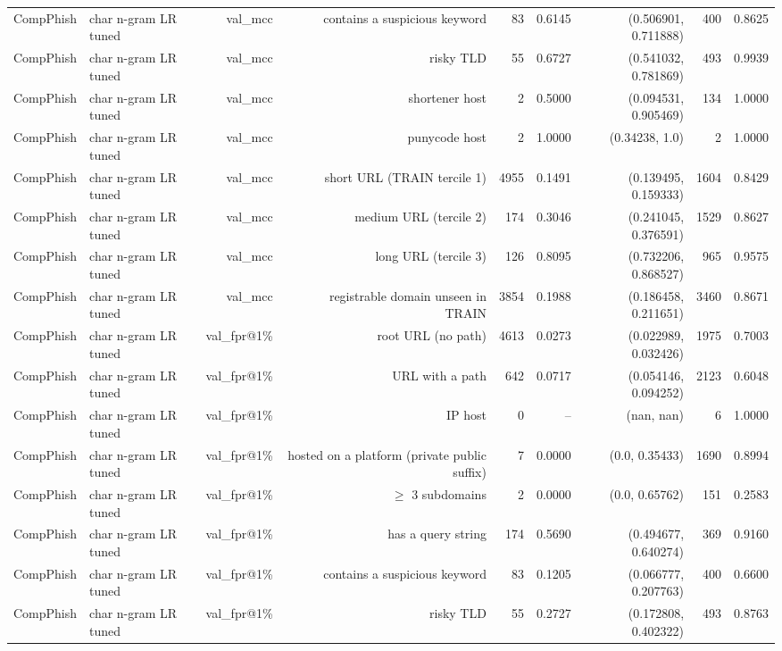 \begin{table}[t]
\begin{tabular}{llrrrrrrr}
CompPhish & char n-gram LR tuned & val\_mcc & contains a suspicious keyword & 83 & 0.6145 & (0.506901, 0.711888) & 400 & 0.8625 \\
CompPhish & char n-gram LR tuned & val\_mcc & risky TLD & 55 & 0.6727 & (0.541032, 0.781869) & 493 & 0.9939 \\
CompPhish & char n-gram LR tuned & val\_mcc & shortener host & 2 & 0.5000 & (0.094531, 0.905469) & 134 & 1.0000 \\
CompPhish & char n-gram LR tuned & val\_mcc & punycode host & 2 & 1.0000 & (0.34238, 1.0) & 2 & 1.0000 \\
CompPhish & char n-gram LR tuned & val\_mcc & short URL (TRAIN tercile 1) & 4955 & 0.1491 & (0.139495, 0.159333) & 1604 & 0.8429 \\
CompPhish & char n-gram LR tuned & val\_mcc & medium URL (tercile 2) & 174 & 0.3046 & (0.241045, 0.376591) & 1529 & 0.8627 \\
CompPhish & char n-gram LR tuned & val\_mcc & long URL (tercile 3) & 126 & 0.8095 & (0.732206, 0.868527) & 965 & 0.9575 \\
CompPhish & char n-gram LR tuned & val\_mcc & registrable domain unseen in TRAIN & 3854 & 0.1988 & (0.186458, 0.211651) & 3460 & 0.8671 \\
CompPhish & char n-gram LR tuned & val\_fpr@1\% & root URL (no path) & 4613 & 0.0273 & (0.022989, 0.032426) & 1975 & 0.7003 \\
CompPhish & char n-gram LR tuned & val\_fpr@1\% & URL with a path & 642 & 0.0717 & (0.054146, 0.094252) & 2123 & 0.6048 \\
CompPhish & char n-gram LR tuned & val\_fpr@1\% & IP host & 0 & -- & (nan, nan) & 6 & 1.0000 \\
CompPhish & char n-gram LR tuned & val\_fpr@1\% & hosted on a platform (private public suffix) & 7 & 0.0000 & (0.0, 0.35433) & 1690 & 0.8994 \\
CompPhish & char n-gram LR tuned & val\_fpr@1\% & $\geq$ 3 subdomains & 2 & 0.0000 & (0.0, 0.65762) & 151 & 0.2583 \\
CompPhish & char n-gram LR tuned & val\_fpr@1\% & has a query string & 174 & 0.5690 & (0.494677, 0.640274) & 369 & 0.9160 \\
CompPhish & char n-gram LR tuned & val\_fpr@1\% & contains a suspicious keyword & 83 & 0.1205 & (0.066777, 0.207763) & 400 & 0.6600 \\
CompPhish & char n-gram LR tuned & val\_fpr@1\% & risky TLD & 55 & 0.2727 & (0.172808, 0.402322) & 493 & 0.8763 \\

\end{tabular}
\end{table}
